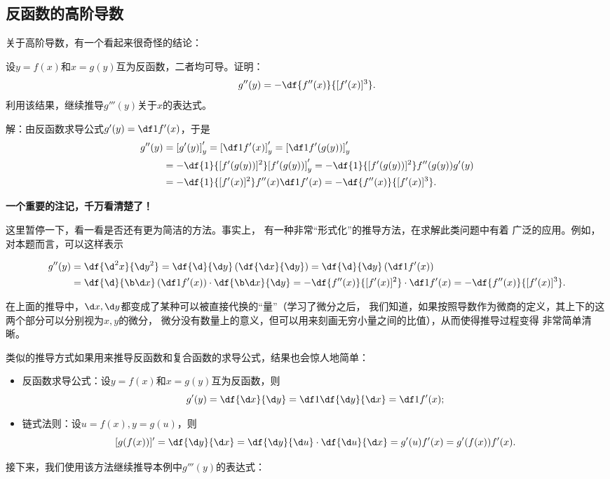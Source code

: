 \subsection{反函数的高阶导数}

\bs
关于高阶导数，有一个看起来很奇怪的结论：

\egz 设$y=f(x)$和$x=g(y)$互为反函数，二者均可导。证明：
$$g''(y)=-\df{f''(x)}{[f'(x)]^3}.$$
利用该结果，继续推导$g'''(y)$关于$x$的表达式。

解：由反函数求导公式$g'(y)=\df1{f'(x)}$，于是
\begin{align*}
	g''(y)&=\left[g'(y)\right]'_y=\left[\df1{f'(x)}\right]'_y
	=\left[\df1{f'(g(y))}\right]'_y\\
	&=-\df{1}{[f'(g(y))]^2}[f'(g(y))]'_y
	=-\df{1}{[f'(g(y))]^2}f''(g(y))g'(y)\\
	&=-\df{1}{[f'(x)]^2}f''(x)\df1{f'(x)}
	=-\df{f''(x)}{[f'(x)]^3}.
\end{align*}
\begin{shaded}
	{\bf\baa 一个重要的注记，千万看清楚了！}
	
	这里暂停一下，看一看是否还有更为简洁的方法。事实上，
	有一种非常“形式化”的推导方法，在求解此类问题中有着
	广泛的应用。例如，对本题而言，可以这样表示
	\begin{tcolorbox}[colframe=red!80!black]
		\begin{align*}
			g''(y)&=\df{\d^2x}{\d y^2}
			=\df{\d }{\d y}\left(\df{\d x}{\d y}\right)
			=\df{\d }{\d y}\left(\df1{f'(x)}\right)\\
			&=\df{\d }{\b\d x}\left(\df1{f'(x)}\right)\cdot\df{\b\d x}{\d y}
			=-\df{f''(x)}{[f'(x)]^2}\cdot\df1{f'(x)}
			=-\df{f''(x)}{[f'(x)]^3}.
		\end{align*}
	\end{tcolorbox}
	在上面的推导中，$\d x,\d y$都变成了某种可以被直接代换的“量”（学习了微分之后，
	我们知道，如果按照导数作为微商的定义，其上下的这两个部分可以分别视为$x,y$的微分，
	微分没有数量上的意义，但可以用来刻画无穷小量之间的比值），从而使得推导过程变得
	非常简单清晰。
	
	类似的推导方式如果用来推导反函数和复合函数的求导公式，结果也会惊人地简单：
	\begin{itemize}
	  \item 反函数求导公式：设$y=f(x)$和$x=g(y)$互为反函数，则
	  $$g'(y)=\df{\d x}{\d y}=\df1{\df{\d y}{\d x}}=\df1{f'(x)};$$
	  \item 链式法则：设$u=f(x),y=g(u)$，则
	  $$[g(f(x))]'=\df{\d y}{\d x}
	  =\df{\d y}{\d u}\cdot \df{\d u}{\d x}
	  =g'(u)f'(x)=g'(f(x))f'(x).$$
	\end{itemize}
	
	接下来，我们使用该方法继续推导本例中$g'''(y)$的表达式：
\end{shaded}
